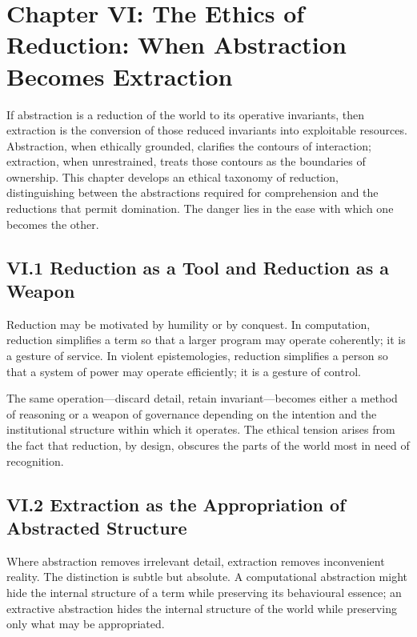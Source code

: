 \documentclass[11pt,letterpaper]{article}
\begin{document}
\section{Chapter VI: The Ethics of Reduction: When Abstraction Becomes Extraction}

If abstraction is a reduction of the world to its operative invariants, then extraction is the conversion of those reduced invariants into exploitable resources. Abstraction, when ethically grounded, clarifies the contours of interaction; extraction, when unrestrained, treats those contours as the boundaries of ownership. This chapter develops an ethical taxonomy of reduction, distinguishing between the abstractions required for comprehension and the reductions that permit domination. The danger lies in the ease with which one becomes the other.

\subsection{VI.1 Reduction as a Tool and Reduction as a Weapon}

Reduction may be motivated by humility or by conquest. In computation, reduction simplifies a term so that a larger program may operate coherently; it is a gesture of service. In violent epistemologies, reduction simplifies a person so that a system of power may operate efficiently; it is a gesture of control.

The same operation—discard detail, retain invariant—becomes either a method of reasoning or a weapon of governance depending on the intention and the institutional structure within which it operates. The ethical tension arises from the fact that reduction, by design, obscures the parts of the world most in need of recognition.

\subsection{VI.2 Extraction as the Appropriation of Abstracted Structure}

Where abstraction removes irrelevant detail, extraction removes inconvenient reality. The distinction is subtle but absolute. A computational abstraction might hide the internal structure of a term while preserving its behavioural essence; an extractive abstraction hides the internal structure of the world while preserving only what may be appropriated.
\end{document}
